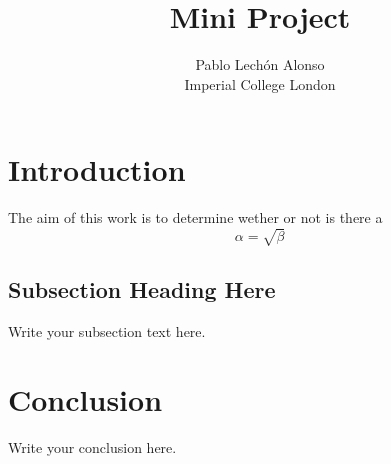 \documentclass[titlepage,11pt]{article}
\begin{document}
\title{Mini Project}
\author{Pablo Lechón Alonso \\ 
			Imperial College London}
\date{}%

\maketitle
\begin{linenumbers}
	\section{Introduction}
		The aim of this work is to determine wether or not is there a 
	\begin{equation}
	\label{simple_equation}
	\alpha = \sqrt{ \beta }
	\end{equation}
	
	\subsection{Subsection Heading Here}
	Write your subsection text here.
	
	
	\section{Conclusion}
	Write your conclusion here.
	
\end{linenumbers}
\end{document}

